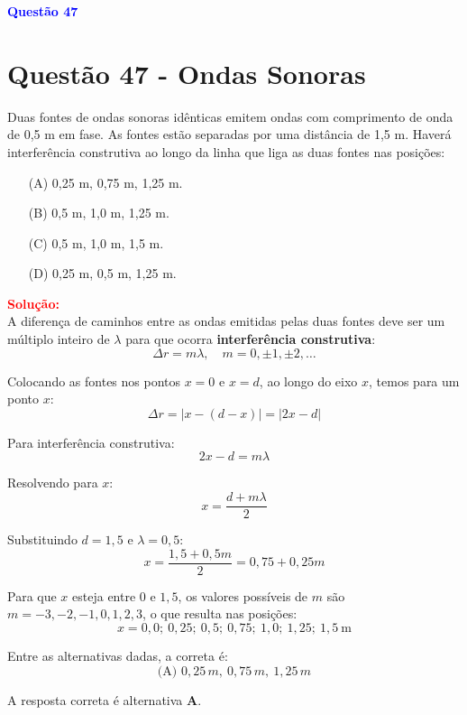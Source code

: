 \documentclass[a4paper,12pt]{article}
\begin{document}
\begin{flushleft}
\textbf{\textcolor{blue}{\Large Quest\~ao 47}}\\
\noindent
\section{Quest\~ao 47 - Ondas Sonoras}
Duas fontes de ondas sonoras idênticas emitem ondas com
comprimento de onda de 0,5 m em fase. As fontes estão
separadas por uma distância de 1,5 m. Haverá interferência
construtiva ao longo da linha que liga as duas fontes nas
posições:

\begin{itemize}
\item[(A)] 0,25 m, 0,75 m, 1,25 m.
\item[(B)] 0,5 m, 1,0 m, 1,25 m.
\item[(C)] 0,5 m, 1,0 m, 1,5 m.
\item[(D)] 0,25 m, 0,5 m, 1,25 m.
\end{itemize}

\vspace{0.5cm}

\textcolor{red}{\textbf{Solução:}}\\

\colorbox{yellow!30}{A diferença de caminhos entre as ondas emitidas pelas duas fontes deve ser um múltiplo} 
\colorbox{yellow!30}{inteiro de \( \lambda \) para que ocorra \textbf{interferência construtiva}:}
\[
\Delta r = m\lambda, \quad m = 0, \pm1, \pm2, \dots
\]

Colocando as fontes nos pontos \( x=0 \) e \( x=d \), ao longo do eixo \( x \), temos para um ponto \( x \):
\[
\Delta r = |x - (d-x)| = |2x - d|
\]

Para interferência construtiva:
\[
2x - d = m\lambda
\]

Resolvendo para \( x \):
\[
x = \frac{d + m\lambda}{2}
\]

Substituindo \( d = 1{,}5 \) e \( \lambda = 0{,}5 \):
\[
x = \frac{1{,}5 + 0{,}5m}{2} = 0{,}75 + 0{,}25m
\]

Para que \( x \) esteja entre \( 0 \) e \( 1{,}5 \), os valores possíveis de \( m \) são \( m = -3, -2, -1, 0, 1, 2, 3 \), o que resulta nas posições:
\[
x = 0{,}0;\ 0{,}25;\ 0{,}5;\ 0{,}75;\ 1{,}0;\ 1{,}25;\ 1{,}5 \ \mathrm{m}
\]

Entre as alternativas dadas, a correta é:
\[
\boxed{\text{(A) } 0{,}25\,m,\ 0{,}75\,m,\ 1{,}25\,m}
\]


A resposta correta é alternativa \colorbox{green!50}{\textbf{A}}.
\end{flushleft}
\end{document}
